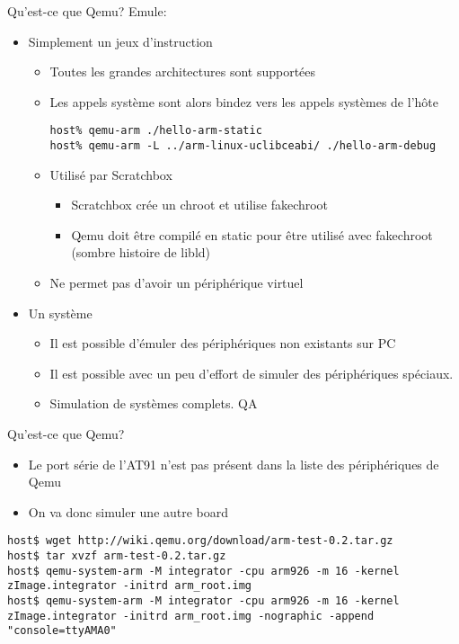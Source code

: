 \begin{frame}[fragile=singleslide]{Qu'est-ce que Qemu?}
  Emule:
  \begin{itemize}
  \item Simplement un jeux d'instruction 
    \begin{itemize}
    \item Toutes les grandes architectures sont supportées
    \item  Les  appels  système  sont  alors bindez  vers  les  appels
      systèmes de l'hôte
      \begin{lstlisting}
host% qemu-arm ./hello-arm-static
host% qemu-arm -L ../arm-linux-uclibceabi/ ./hello-arm-debug
      \end{lstlisting}
    \item Utilisé par Scratchbox
      \begin{itemize}
      \item Scratchbox crée un chroot et utilise fakechroot
      \item Qemu  doit être compilé  en static pour être  utilisé avec
        fakechroot (sombre histoire de libld) %
      \end{itemize}
    \item Ne permet pas d'avoir un périphérique virtuel
    \end{itemize}
  \item Un système
    \begin{itemize}
    \item Il est possible  d'émuler des périphériques non existants sur
      PC
    \item  Il  est  possible  avec  un peu  d'effort  de  simuler  des
      périphériques spéciaux.
    \item Simulation de systèmes complets. QA
    \end{itemize}
  \end{itemize}
\end{frame}

\begin{frame}[fragile=singleslide]{Qu'est-ce que Qemu?}
  \begin{itemize}
  \item Le  port série de l'AT91  n'est pas présent dans  la liste des
    périphériques de Qemu
  \item On va donc simuler une autre board
  \end{itemize}
  \begin{lstlisting}[basicstyle=\ttfamily\scriptsize\color{colBasic}]
host$ wget http://wiki.qemu.org/download/arm-test-0.2.tar.gz
host$ tar xvzf arm-test-0.2.tar.gz
host$ qemu-system-arm -M integrator -cpu arm926 -m 16 -kernel zImage.integrator -initrd arm_root.img
host$ qemu-system-arm -M integrator -cpu arm926 -m 16 -kernel zImage.integrator -initrd arm_root.img -nographic -append "console=ttyAMA0"
  \end{lstlisting}
\end{frame}

